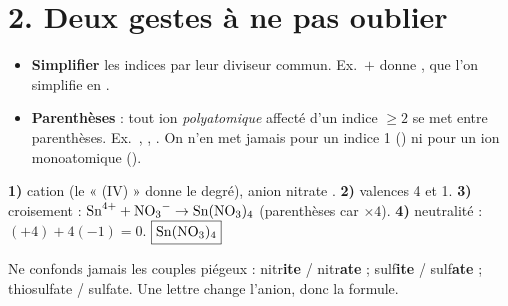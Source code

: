 \documentclass[11pt,a4paper]{article}
\begin{document}
\section*{2. Deux gestes à ne pas oublier}
\begin{regle}
\begin{itemize}[leftmargin=1.5em,topsep=2pt,itemsep=1pt]
  \item \textbf{Simplifier} les indices par leur diviseur commun. Ex.\ $+$ donne
        , que l'on simplifie en .
  \item \textbf{Parenthèses} : tout ion \emph{polyatomique} affecté d'un indice $\geq 2$ se met entre
        parenthèses. Ex.\ , , . On n'en met jamais pour un indice 1
        () ni pour un ion monoatomique ().
\end{itemize}
\end{regle}

\begin{exemple}
\textbf{1)} cation  (le « (IV) » donne le degré), anion nitrate . \quad
\textbf{2)} valences 4 et 1. \quad
\textbf{3)} croisement : $\ce{Sn^4+} + \ce{NO3-} \to \ce{Sn(NO3)4}$ (parenthèses car  $\times 4$). \quad
\textbf{4)} neutralité : $(+4) + 4(-1) = 0$. \checkmark \quad
$\boxed{\ce{Sn(NO3)4}}$
\end{exemple}

\begin{attention}
Ne confonds jamais les couples piégeux : nitr\textbf{ite}  / nitr\textbf{ate}  ;
sulf\textbf{ite}  / sulf\textbf{ate}  ; thiosulfate  / sulfate.
Une lettre change l'anion, donc la formule.
\end{attention}
\end{document}
